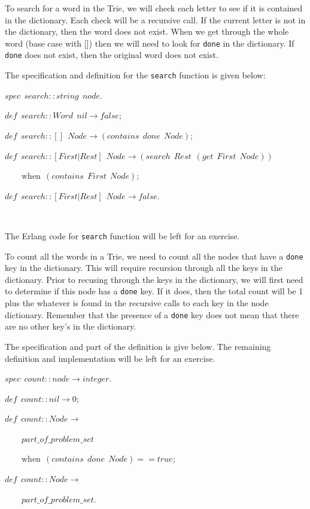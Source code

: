 \documentclass[
]{book}
\begin{document}
To search for a word in the Trie, we will check each letter to see if it is contained in the dictionary. Each check will be a recursive call. If the current letter is not in the dictionary, then the word does not exist. When we get through the whole word (base case with {[}{]}) then we will need to look for \texttt{done} in the dictionary. If \texttt{done} does not exist, then the original word does not exist.

The specification and definition for the \texttt{search} function is given below:

\begin{formulabox}
\(spec ~ ~ search :: string ~ ~ node.\)

\(de\mathit{f} ~ ~ search :: Word ~ ~ nil \rightarrow false;\)

\(de\mathit{f} ~ ~ search :: [] ~ ~ Node \rightarrow (contains ~ ~ done ~ ~ Node);\)

\(de\mathit{f} ~ ~ search :: [First|Rest] ~ ~ Node \rightarrow (search ~ ~ Rest ~ ~ (get ~ ~ First ~ ~ Node)) ~ ~\)

\(\quad \quad \text{when} ~ ~ (contains ~ ~ First ~ ~ Node);\)

\(de\mathit{f} ~ ~ search :: [First|Rest] ~ ~ Node \rightarrow false.\)

\end{formulabox}

\(\nonumber\)

The Erlang code for \texttt{search} function will be left for an exercise.

To count all the words in a Trie, we need to count all the nodes that have a \texttt{done} key in the dictionary. This will require recursion through all the keys in the dictionary. Prior to recusing through the keys in the dictionary, we will first need to determine if this node has a \texttt{done} key. If it does, then the total count will be 1 plus the whatever is found in the recursive calls to each key in the node dictionary. Remember that the presence of a \texttt{done} key does not mean that there are no other key's in the dictionary.

The specification and part of the definition is give below. The remaining definition and implementation will be left for an exercise.

\begin{formulabox}
\(spec ~ ~ count :: node \rightarrow integer.\)

\(de\mathit{f} ~ ~ count :: nil \rightarrow 0;\)

\(de\mathit{f} ~ ~ count :: Node \rightarrow\)

\(\quad \quad part\_of\_problem\_set\)

\(\quad \quad \text{when} ~ ~ (contains ~ ~ done ~ ~ Node) == true;\)

\(de\mathit{f} ~ ~ count :: Node \rightarrow\)

\(\quad \quad part\_of\_problem\_set.\)

\end{formulabox}
\end{document}
